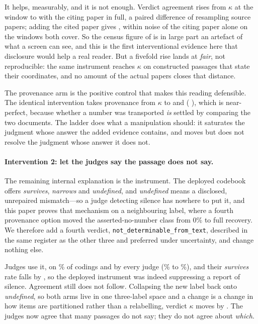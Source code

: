 \documentclass[11pt]{article}
\begin{document}
It helps, measurably, and it is not enough. Verdict agreement rises from
$\kappa$ \LadVdWinK{} at the window to \LadVdCiteK{} with the citing paper in
full, a paired difference of \LadVdDeltaCite{} \LadVdDeltaCiteCI{} resampling
source papers; adding the cited paper gives \LadVdBothK{}, within noise of the
citing paper alone on the windows both cover. So the census figure of
\DecVerdictK{} is in large part an artefact of what a screen can see, and this
is the first interventional evidence here that disclosure would help a real
reader. But a fivefold rise lands at \emph{fair}, not reproducible: the same
instrument reaches $\kappa$ \InsFullK{} on constructed passages that state their
coordinates, and no amount of the actual papers closes that distance.

The provenance arm is the positive control that makes this reading defensible.
The identical intervention takes provenance from $\kappa$ \LadPvWinK{} to
\LadPvCiteK{} and \LadPvBothK{} (\LadPvDeltaBoth{} \LadPvDeltaBothCI{}), which
is near-perfect, because whether a number was transported \emph{is} settled by
comparing the two documents. The ladder does what a manipulation should: it
saturates the judgment whose answer the added evidence contains, and moves but
does not resolve the judgment whose answer it does not.

\paragraph{Intervention 2: let the judges say the passage does not say.}
The remaining internal explanation is the instrument. The deployed codebook
offers \emph{survives}, \emph{narrows} and \emph{undefined}, and
\emph{undefined} means a disclosed, unrepaired mismatch---so a judge detecting
silence has nowhere to put it, and this paper proves that mechanism on a
neighbouring label, where a fourth provenance option moved the
asserted-no-number class from $0\%$ to full recovery. We therefore add a fourth
verdict, \texttt{not\_determinable\_from\_text}, described in the same register
as the other three and preferred under uncertainty, and change nothing else.

Judges use it, on \AbsShare\% of codings and by every judge (\AbsPerJudgeLo\% to
\AbsPerJudgeHi\%), and their \emph{survives} rate falls by \AbsSurvivesDrop{},
so the deployed instrument was indeed suppressing a report of silence.
Agreement still does not follow. Collapsing the new label back onto
\emph{undefined}, so both arms live in one three-label space and a change is a
change in how items are partitioned rather than a relabelling, verdict $\kappa$
moves by \AbsKDiff{} \AbsKDiffCI{}. The judges now agree that many passages do
not say; they do not agree about \emph{which}.
\end{document}
